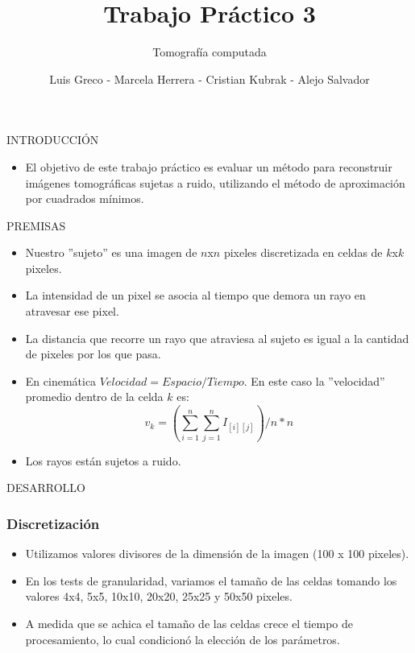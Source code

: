 \documentclass[11pt]{beamer}
\author{Luis Greco - Marcela Herrera - Cristian Kubrak - Alejo Salvador }
\title{Trabajo Práctico 3}
\subtitle{Tomografía computada}
\begin{document}
\begin{frame}
\titlepage 
\end{frame}


\begin{frame}{INTRODUCCIÓN}
\begin{itemize}
\item El objetivo de este trabajo práctico es evaluar un método para reconstruir imágenes tomográficas sujetas a ruido, utilizando el método de aproximación por cuadrados mínimos.
\end{itemize}
\end{frame}

\begin{frame}{PREMISAS}
\begin{itemize}
\item Nuestro ''sujeto'' es una imagen de $n$x$n$ pixeles discretizada en celdas de $k$x$k$ pixeles.
\item La intensidad de un pixel se asocia al tiempo que demora un rayo en atravesar ese pixel.
\item La distancia que recorre un rayo que atraviesa al sujeto es igual a la cantidad de pixeles por los que pasa.
\item En cinemática $Velocidad = Espacio/Tiempo$. En este caso la ''velocidad'' promedio dentro de la celda $k$ es:
\begin{displaymath}
v_{k} =(\sum_{i=1}^{n}\sum_{j=1}^{n} I_{[i][j]})/n*n
\end{displaymath}
\item Los rayos están sujetos a ruido.
\end{itemize}
\end{frame}


\begin{frame}{DESARROLLO}
\frametitle {Discretización}
\begin{itemize}
\item Utilizamos valores divisores de la dimensión de la imagen (100 x 100 pixeles).
\item En los tests de granularidad, variamos el tamaño de las celdas tomando los valores 4x4, 5x5, 10x10, 20x20, 25x25 y 50x50 pixeles.
\item A medida que se achica el tamaño de las celdas crece el tiempo de procesamiento, lo cual condicionó la elección de los parámetros.
\end{itemize}
\end{frame}
\end{document}
